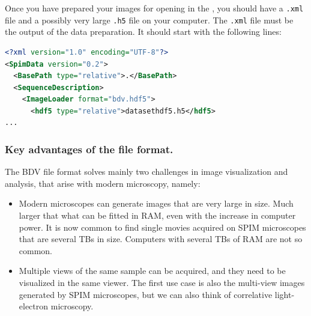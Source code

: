 Once you have prepared your images for opening in the \bdv, you should have a \texttt{.xml} file and a possibly very large \texttt{.h5} file on your computer. The \texttt{.xml} file must be the output of the \bdv data preparation. It should start with the following lines:

\begin{lstlisting}[language=XML]
<?xml version="1.0" encoding="UTF-8"?>
<SpimData version="0.2">
  <BasePath type="relative">.</BasePath>
  <SequenceDescription>
    <ImageLoader format="bdv.hdf5">
      <hdf5 type="relative">datasethdf5.h5</hdf5>
...
\end{lstlisting}


\subsubsection{Key advantages of the \Bdv file format.}
\label{BDV_advantages}

The BDV file format solves mainly two challenges in image visualization and analysis, that arise with modern microscopy, namely:
\begin{itemize}
    
    \item Modern microscopes can generate images that are very large in size. Much larger that what can be fitted in RAM, even with the increase in computer power. It is now common to find single movies acquired on SPIM microscopes that are several TBs in size. Computers with several TBs of RAM are not so common.
    
    \item Multiple views of the same sample can be acquired, and they need to be visualized in the same viewer. The first use case is also the multi-view images generated by SPIM microscopes, but we can also think of correlative light-electron microscopy.
    
\end{itemize}

